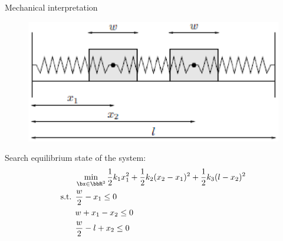 \documentclass[12pt]{beamer}
\begin{document}
\begin{frame}{Mechanical interpretation}
\begin{figure}
\centering
\includegraphics[scale=0.5]{kkt_mechanics.eps}
\end{figure}
Search equilibrium state of the system:
\begin{equation*}
\begin{split}
& \min_{\bx \in \bbR^3} \frac{1}{2}k_1x_1^2 + \frac{1}{2}k_2(x_2 - x_1)^2 + \frac{1}{2}k_3 (l - x_2)^2\\
\text{s.t. } & \frac{w}{2} - x_1 \leq 0\\
& w + x_1 - x_2 \leq 0\\
& \frac{w}{2} - l + x_2 \leq 0
\end{split}
\end{equation*}

\end{frame}
\end{document}
